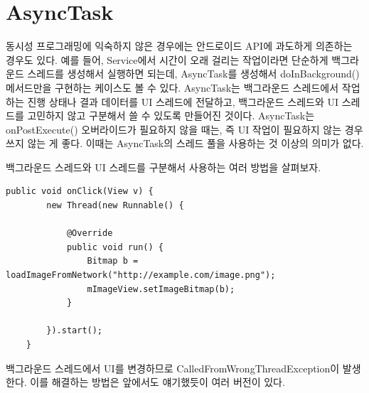\section{AsyncTask}
\label{sec:asynctask}
동시성 프로그래밍에 익숙하지 않은 경우에는 안드로이드 API에 과도하게 의존하는 경우도 있다.
예를 들어, Service에서 시간이 오래 걸리는 작업이라면 단순하게 백그라운드 스레드를 생성해서 실행하면 되는데, AsyncTask를 생성해서 doInBackground() 메서드만을 구현하는 케이스도 볼 수 있다. 
AsyncTask는 백그라운드 스레드에서 작업하는 진행 상태나 결과 데이터를 UI 스레드에 전달하고, 백그라운드 스레드와 UI 스레드를 고민하지 않고 구분해서 쓸 수 있도록 만들어진 것이다.
AsyncTask는 onPostExecute() 오버라이드가 필요하지 않을 때는, 즉 UI 작업이 필요하지 않는 경우 쓰지 않는 게 좋다. 이때는 AsyncTask의 스레드 풀을 사용하는 것 이상의 의미가 없다.

백그라운드 스레드와 UI 스레드를 구분해서 사용하는 여러 방법을 살펴보자.
\begin{lstlisting}[frame=single] 
	public void onClick(View v) {
    	new Thread(new Runnable() {
    		
    		@Override
        	public void run() {
            	Bitmap b = loadImageFromNetwork("http://example.com/image.png");
            	mImageView.setImageBitmap(b);
        	}
        	
    	}).start();
	}
\end{lstlisting}
백그라운드 스레드에서 UI를 변경하므로 CalledFromWrongThreadException이 발생한다.
이를 해결하는 방법은 앞에서도 얘기했듯이 여러 버전이 있다.

